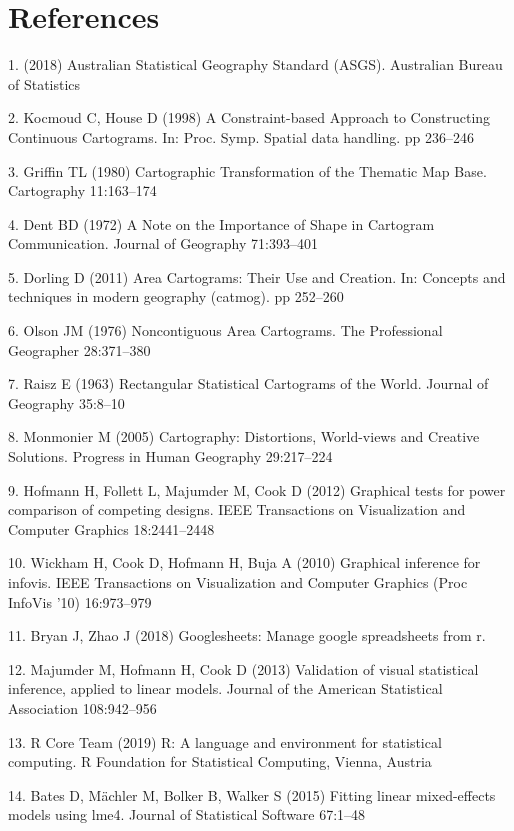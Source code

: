 \documentclass[conference,final,]{IEEEtran}
\begin{document}
\newpage

\hypertarget{references}{%
\section{References}\label{references}}

\hypertarget{refs}{}
\leavevmode\hypertarget{ref-abs2016}{}%
1. (2018) Australian Statistical Geography Standard (ASGS). Australian Bureau of Statistics

\leavevmode\hypertarget{ref-CBATCC}{}%
2. Kocmoud C, House D (1998) A Constraint-based Approach to Constructing Continuous Cartograms. In: Proc. Symp. Spatial data handling. pp 236--246

\leavevmode\hypertarget{ref-CTTMB}{}%
3. Griffin TL (1980) Cartographic Transformation of the Thematic Map Base. Cartography 11:163--174

\leavevmode\hypertarget{ref-NISCC}{}%
4. Dent BD (1972) A Note on the Importance of Shape in Cartogram Communication. Journal of Geography 71:393--401

\leavevmode\hypertarget{ref-ACTUC}{}%
5. Dorling D (2011) Area Cartograms: Their Use and Creation. In: Concepts and techniques in modern geography (catmog). pp 252--260

\leavevmode\hypertarget{ref-NAC}{}%
6. Olson JM (1976) Noncontiguous Area Cartograms. The Professional Geographer 28:371--380

\leavevmode\hypertarget{ref-RSCW}{}%
7. Raisz E (1963) Rectangular Statistical Cartograms of the World. Journal of Geography 35:8--10

\leavevmode\hypertarget{ref-CDWCS}{}%
8. Monmonier M (2005) Cartography: Distortions, World-views and Creative Solutions. Progress in Human Geography 29:217--224

\leavevmode\hypertarget{ref-GTPCCD}{}%
9. Hofmann H, Follett L, Majumder M, Cook D (2012) Graphical tests for power comparison of competing designs. IEEE Transactions on Visualization and Computer Graphics 18:2441--2448

\leavevmode\hypertarget{ref-GIIV}{}%
10. Wickham H, Cook D, Hofmann H, Buja A (2010) Graphical inference for infovis. IEEE Transactions on Visualization and Computer Graphics (Proc InfoVis '10) 16:973--979

\leavevmode\hypertarget{ref-sheets}{}%
11. Bryan J, Zhao J (2018) Googlesheets: Manage google spreadsheets from r.

\leavevmode\hypertarget{ref-VVSIALM}{}%
12. Majumder M, Hofmann H, Cook D (2013) Validation of visual statistical inference, applied to linear models. Journal of the American Statistical Association 108:942--956

\leavevmode\hypertarget{ref-RCore}{}%
13. R Core Team (2019) R: A language and environment for statistical computing. R Foundation for Statistical Computing, Vienna, Austria

\leavevmode\hypertarget{ref-lme4}{}%
14. Bates D, Mächler M, Bolker B, Walker S (2015) Fitting linear mixed-effects models using lme4. Journal of Statistical Software 67:1--48
\end{document}
